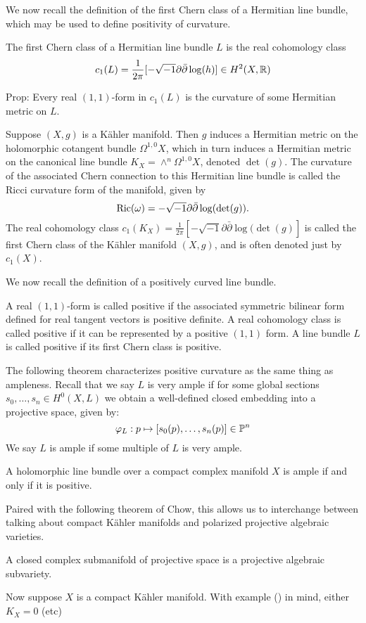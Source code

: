 We now recall the definition of the first Chern class of a Hermitian line bundle, which may be used to define positivity of curvature. 
\begin{definition}
The first Chern class of a Hermitian line bundle \(L\) is the real cohomology class
\[
c_1(L) = \frac{1}{2 \pi} [  - \sqrt{-1} \partial \bar{\partial} \log(h) ] \in H^2(X, \mathbb{R})
\]
\end{definition}
Prop: Every real \((1,1)\)-form in \(c_1(L)\) is the curvature of some Hermitian metric on \(L\).
\begin{example}
Suppose \((X,g)\) is a K\"ahler manifold. Then \(g\) induces a Hermitian metric on the holomorphic cotangent bundle \(\Omega^{1,0} X\), which in turn induces a Hermitian metric on the canonical line bundle \(K_X = \wedge^{n} \Omega^{1,0} X\), denoted \(\det(g)\). The curvature of the associated Chern connection to this Hermitian line bundle is called the Ricci curvature form of the manifold, given by
\[
\mathop{\rm Ric}\nolimits(\omega) = - \sqrt{-1} \partial \bar{\partial} \log( \det(g) ).
\]
The real cohomology class \(c_1(K_X) = \frac{1}{2 \pi} [  - \sqrt{-1} \partial \bar{\partial} \log( \det(g) ]  \) is called the first Chern class of the K\"ahler manifold \((X,g)\), and is often denoted just by \(c_1(X)\).
\end{example}
We now recall the definition of a positively curved line bundle.
\begin{definition}
A real \((1,1)\)-form is called positive if the associated symmetric bilinear form defined for real tangent vectors is positive definite. A real cohomology class is called positive if it can be represented by a positive \((1,1)\) form. A line bundle \(L\) is called positive if its first Chern class is positive.
\end{definition}
The following theorem characterizes positive curvature as the same thing as ampleness. Recall that we say \(L\) is very ample if for some global sections \(s_0,\dots,s_n \in H^0(X,L)\) we obtain a well-defined closed embedding into a projective space, given by:
\[
\varphi_L: p \mapsto [s_0(p),\dots,s_n(p)] \in \mathbb{P}^n
\]
We say \(L\) is ample if some multiple of \(L\) is very ample.
\begin{theorem}
A holomorphic line bundle over a compact complex manifold \(X\) is ample if and only if it is positive.
\end{theorem}
Paired with the following theorem of Chow, this allows us to interchange between talking about compact K\"ahler manifolds and polarized projective algebraic varieties.
\begin{theorem}
A closed complex submanifold of projective space is a projective algebraic subvariety.
\end{theorem}
Now suppose \(X\) is a compact K\"ahler manifold. With example () in mind, either \(K_X = 0\) (etc)
